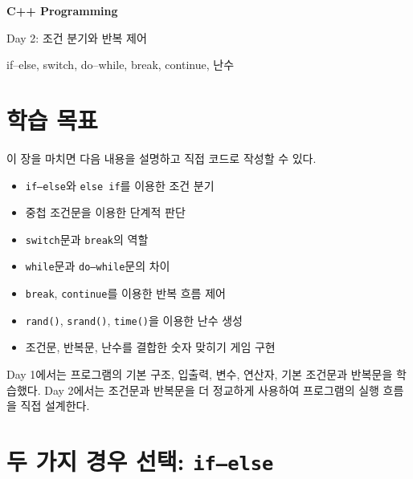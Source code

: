 \documentclass[11pt,a4paper]{article}
\begin{document}
\begin{titlepage}
    \centering
    \vspace*{3cm}

    {\Huge\bfseries C++ Programming\par}
    \vspace{0.8cm}
    {\LARGE Day 2: 조건 분기와 반복 제어\par}

    \vspace{2cm}

    {\large if--else, switch, do--while, break, continue, 난수\par}

    \vfill

\end{titlepage}

\tableofcontents
\newpage

\section{학습 목표}

\begin{learningbox}
이 장을 마치면 다음 내용을 설명하고 직접 코드로 작성할 수 있다.
\begin{itemize}[leftmargin=1.5em]
    \item \texttt{if--else}와 \texttt{else if}를 이용한 조건 분기
    \item 중첩 조건문을 이용한 단계적 판단
    \item \texttt{switch}문과 \texttt{break}의 역할
    \item \texttt{while}문과 \texttt{do--while}문의 차이
    \item \texttt{break}, \texttt{continue}를 이용한 반복 흐름 제어
    \item \texttt{rand()}, \texttt{srand()}, \texttt{time()}을 이용한 난수 생성
    \item 조건문, 반복문, 난수를 결합한 숫자 맞히기 게임 구현
\end{itemize}
\end{learningbox}

Day 1에서는 프로그램의 기본 구조, 입출력, 변수, 연산자, 기본 조건문과 반복문을 학습했다.
Day 2에서는 조건문과 반복문을 더 정교하게 사용하여 프로그램의 실행 흐름을 직접 설계한다.

\section{두 가지 경우 선택: \texttt{if--else}}
\end{document}

